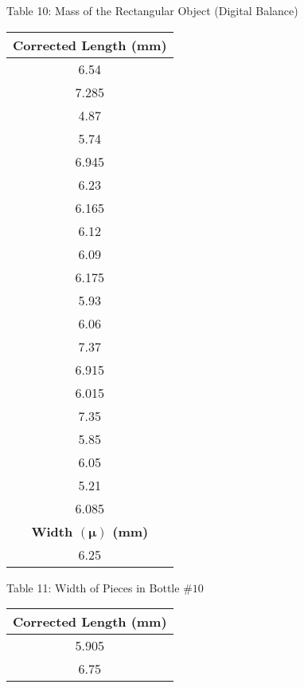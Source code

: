 \begin{center}
\begin{center}
\begin{tabular}{|c|c|}
        \hline
    \end{tabular}
\end{center}
Table 10: Mass of the Rectangular Object (Digital Balance)\\
\begin{center}
    \begin{tabular}{|c|}
        \hline
        \textbf{Corrected Length (mm)} \\
        \hline
        6.54 \\
        \hline
        7.285 \\
        \hline
        4.87 \\
        \hline
        5.74 \\
        \hline
        6.945 \\
        \hline
        6.23 \\
        \hline
        6.165 \\
        \hline
        6.12 \\
        \hline
        6.09 \\
        \hline
        6.175 \\
        \hline
        5.93 \\
        \hline
        6.06 \\
        \hline
        7.37 \\
        \hline
        6.915 \\
        \hline
        6.015 \\
        \hline
        7.35 \\
        \hline
        5.85 \\
        \hline
        6.05 \\
        \hline
        5.21 \\
        \hline
        6.085 \\
        \hline
        \hline
        \textbf{Width $(\bm{\mu})$ (mm)}  \\
        \hline
        6.25 \\
        \hline
    \end{tabular}
\end{center}
Table 11: Width of Pieces in Bottle \(\#10\)\\
\begin{center}
    \begin{tabular}{|c|}
        \hline
        \textbf{Corrected Length (mm)} \\
        \hline
        5.905 \\
        \hline
        6.75 \\

\end{tabular}
\end{center}
\end{center}
